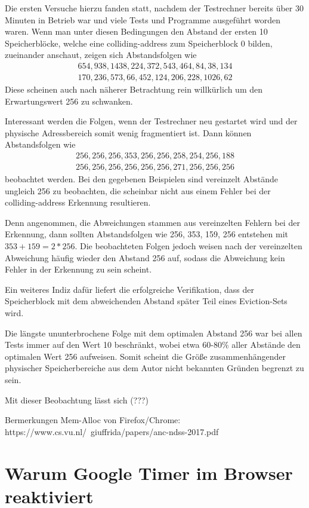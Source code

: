Die ersten Versuche hierzu fanden statt, nachdem der Testrechner bereits über 30 Minuten in Betrieb war und viele Tests und Programme ausgeführt worden waren.
Wenn man unter diesen Bedingungen den Abstand der ersten 10 Speicherblöcke, welche eine colliding-address zum Speicherblock 0 bilden, zueinander anschaut, zeigen sich Abstandsfolgen wie 
\begin{align*} 
654, 938, 1438, 224, 372, 543, 464, 84, 38, 134\\
170, 236, 573, 66, 452, 124, 206, 228, 1026, 62
\end{align*}
Diese scheinen auch nach näherer Betrachtung rein willkürlich um den Erwartungswert 256 zu schwanken.

Interessant werden die Folgen, wenn der Testrechner neu gestartet wird und der physische Adressbereich somit wenig fragmentiert ist.
Dann können Abstandsfolgen wie 
\begin{align*} 
256, 256, 256, 353, 256, 256, 258, 254, 256, 188\\
256, 256, 256, 256, 256, 256, 271, 256, 256, 256
\end{align*}
beobachtet werden.
Bei den gegebenen Beispielen sind vereinzelt Abstände ungleich 256 zu beobachten, die scheinbar nicht aus einem Fehler bei der colliding-address Erkennung resultieren.

Denn angenommen, die Abweichungen stammen aus vereinzelten Fehlern bei der Erkennung, dann sollten Abstandsfolgen wie 256, 353, 159, 256 entstehen mit $353+159=2*256$.
Die beobachteten Folgen jedoch weisen nach der vereinzelten Abweichung häufig wieder den Abstand 256 auf, sodass die Abweichung kein Fehler in der Erkennung zu sein scheint.

Ein weiteres Indiz dafür liefert die erfolgreiche Verifikation, dass der Speicherblock mit dem abweichenden Abstand später Teil eines Eviction-Sets wird.

Die längste ununterbrochene Folge mit dem optimalen Abstand 256 war bei allen Tests immer auf den Wert 10 beschränkt, wobei etwa 60-80\% aller Abstände den optimalen Wert 256 aufweisen.
Somit scheint die Größe zusammenhängender physischer Speicherbereiche aus dem Autor nicht bekannten Gründen begrenzt zu sein.

Mit dieser Beobachtung lässt sich (???)

Bermerkungen Mem-Alloc von Firefox/Chrome: https://www.cs.vu.nl/~giuffrida/papers/anc-ndss-2017.pdf
\cite{ASLROnTheLine}

\section{Warum Google Timer im Browser reaktiviert}
\label{GooglePageIsolation}


